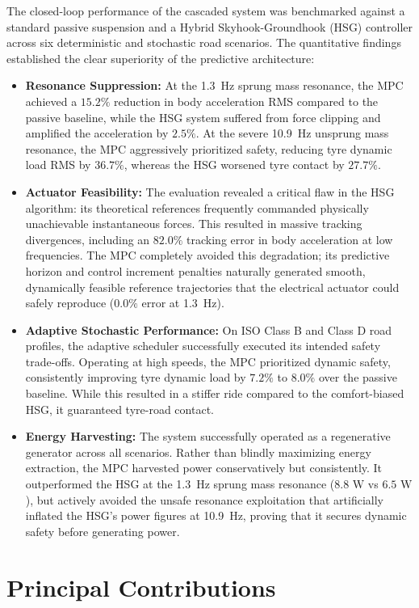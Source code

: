 The closed-loop performance of the cascaded system was benchmarked against a standard passive suspension and a Hybrid Skyhook-Groundhook (HSG) controller across six deterministic and stochastic road scenarios. The quantitative findings established the clear superiority of the predictive architecture:
\begin{itemize}
    \item \textbf{Resonance Suppression:} At the 1.3~Hz sprung mass resonance, the MPC achieved a $15.2\%$ reduction in body acceleration RMS compared to the passive baseline, while the HSG system suffered from force clipping and amplified the acceleration by $2.5\%$. At the severe 10.9~Hz unsprung mass resonance, the MPC aggressively prioritized safety, reducing tyre dynamic load RMS by $36.7\%$, whereas the HSG worsened tyre contact by $27.7\%$.
    \item \textbf{Actuator Feasibility:} The evaluation revealed a critical flaw in the HSG algorithm: its theoretical references frequently commanded physically unachievable instantaneous forces. This resulted in massive tracking divergences, including an $82.0\%$ tracking error in body acceleration at low frequencies. The MPC completely avoided this degradation; its predictive horizon and control increment penalties naturally generated smooth, dynamically feasible reference trajectories that the electrical actuator could safely reproduce ($0.0\%$ error at 1.3~Hz).
    \item \textbf{Adaptive Stochastic Performance:} On ISO Class B and Class D road profiles, the adaptive scheduler successfully executed its intended safety trade-offs. Operating at high speeds, the MPC prioritized dynamic safety, consistently improving tyre dynamic load by $7.2\%$ to $8.0\%$ over the passive baseline. While this resulted in a stiffer ride compared to the comfort-biased HSG, it guaranteed tyre-road contact.
    \item \textbf{Energy Harvesting:} The system successfully operated as a regenerative generator across all scenarios. Rather than blindly maximizing energy extraction, the MPC harvested power conservatively but consistently. It outperformed the HSG at the 1.3~Hz sprung mass resonance ($8.8\text{ W}$ vs $6.5\text{ W}$), but actively avoided the unsafe resonance exploitation that artificially inflated the HSG's power figures at 10.9~Hz, proving that it secures dynamic safety before generating power.\end{itemize}

\section{Principal Contributions}
\label{sec:conclusion_contributions}

